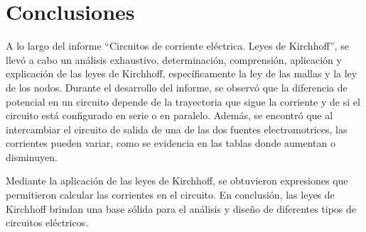 \documentclass[twocolumn, 12pt]{article}
\begin{document}
\section{Conclusiones}

A lo largo del informe ``Circuitos de corriente eléctrica.
Leyes de Kirchhoff'', se llevó a cabo un análisis
exhaustivo, determinación, comprensión, aplicación y
explicación de las leyes de Kirchhoff, específicamente la
ley de las mallas y la ley de los nodos. Durante el
desarrollo del informe, se observó que la diferencia de
potencial en un circuito depende de la trayectoria que
sigue la corriente y de si el circuito está configurado en
serie o en paralelo. Además, se encontró que al
intercambiar el circuito de salida de una de las dos
fuentes electromotrices, las corrientes pueden variar, como
se evidencia en las tablas donde aumentan o disminuyen.

Mediante la aplicación de las leyes de Kirchhoff, se
obtuvieron expresiones que permitieron calcular las
corrientes en el circuito. En conclusión, las leyes de
Kirchhoff brindan una base sólida para el análisis y diseño
de diferentes tipos de circuitos eléctricos.

\printbibliography
\end{document}
